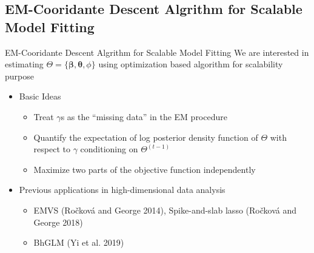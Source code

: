 \documentclass[
  ignorenonframetext,
  aspectratio=169]{beamer}
\providecommand{\tightlist}{%
  \setlength{\itemsep}{0pt}\setlength{\parskip}{0pt}}
\begin{document}
\hypertarget{em-cooridante-descent-algrithm-for-scalable-model-fitting}{%
\subsection{EM-Cooridante Descent Algrithm for Scalable Model
Fitting}\label{em-cooridante-descent-algrithm-for-scalable-model-fitting}}

\begin{frame}{EM-Cooridante Descent Algrithm for Scalable Model Fitting}
We are interested in estimating
\(\Theta = \{\bm \beta, \bm \theta, \phi\}\) using optimization based
algorithm for scalability purpose

\begin{itemize}
\tightlist
\item
  Basic Ideas

  \begin{itemize}
  \tightlist
  \item
    Treat \(\gamma\)s as the ``missing data'' in the EM procedure
  \item
    Quantify the expectation of log posterior density function of
    \(\Theta\) with respect to \(\gamma\) conditioning on
    \(\Theta^{(t-1)}\)
  \item
    Maximize two parts of the objective function independently
  \end{itemize}
\item
  Previous applications in high-dimensional data analysis

  \begin{itemize}
  \tightlist
  \item
    EMVS (Ročková and George 2014), Spike-and-slab lasso (Ročková and
    George 2018)
  \item
    BhGLM (Yi et al. 2019)
  \end{itemize}
\end{itemize}
\end{frame}
\end{document}
